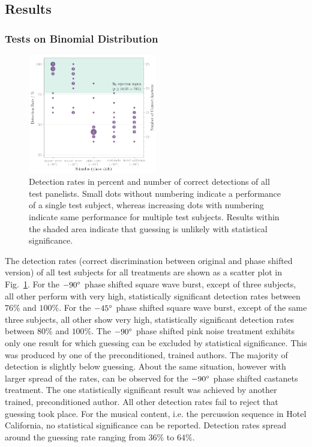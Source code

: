 \subsection{Results}
\subsubsection{Tests on Binomial Distribution}
%
\begin{figure}[t]
\centering
\includegraphics[width=0.5\textwidth]{graphics/scatter}
\caption{Detection rates in percent and number of
correct detections of all test panelists. Small dots without numbering indicate
a performance of a single test subject, whereas increasing dots with numbering
indicate same performance for multiple test subjects. Results within the
\colorbox{colhnull}{shaded area} indicate that guessing is unlikely with statistical significance.}
\label{fig:scatter}
\end{figure}
%
The detection rates (correct discrimination between original and phase shifted
version) of all test subjects for all treatments are shown as a scatter plot in
Fig.~\ref{fig:scatter}.
%
For the $-90\degree$ phase shifted square wave burst, except of three subjects, all
other perform with very high, statistically significant detection rates between
$76\%$ and $100\%$.
%
For the $-45\degree$ phase shifted square wave burst, except of the same  three subjects,
all other show very high, statistically significant detection rates between
$80\%$ and $100\%$.
%
\NewL The $-90\degree$ phase shifted pink noise treatment exhibits only one result
for which guessing can be excluded by statistical significance.
This was produced by one of the preconditioned, trained authors.
%
The majority of detection is slightly below guessing.
%
About the same situation, however with larger spread of the rates, can be observed
for the $-90\degree$ phase shifted castanets treatment.
The one statistically significant result was achieved by another trained,
preconditioned author.
%
All other detection rates fail to reject that guessing took place.
%
\NewL For the musical content, i.e. the percussion sequence in Hotel California,
no statistical significance can be reported.
%
Detection rates spread around the guessing rate ranging from $36\%$ to
$64\%$.

